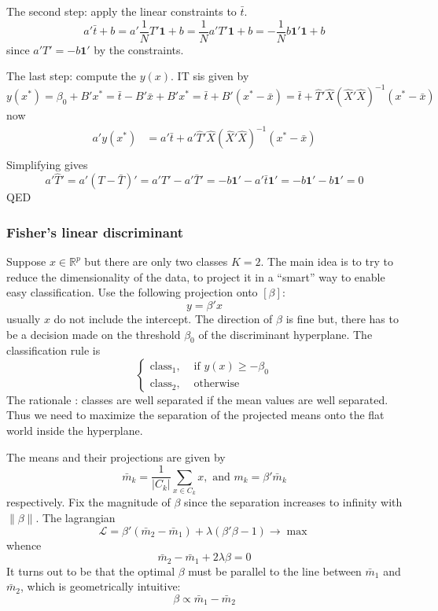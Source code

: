 \documentclass[a4paper]{article}
\newcommand{\Real}{\mathbb{R}}
\newcommand{\Lcal}{\mathcal{L}}
\newcommand{\one}{\mathbf{1}}
\begin{document}
The second step: apply the linear constraints to $\bar{t}$.
\[
a'\bar{t} + b
= a'\frac{1}{N}T'\one + b
= \frac{1}{N} a'T'\one + b
= -\frac{1}{N} b\one' \one + b
\]
since $a'T' = -b\one'$ by the constraints.

The last step: compute the $y(x)$.
IT sis given by
\[
y(x^*)
= \beta_0 + B'x^*
= \bar{t} - B'\bar{x} + B'x^*
= \bar{t} + B'(x^*-\bar{x})
= \bar{t} + \hat{T}'\hat{X}(\hat{X}'\hat{X})^{-1}(x^*-\bar{x})
\]
now \begin{align*}
a'y(x^*)
	&= a'\bar{t} + a'\hat{T}'\hat{X}(\hat{X}'\hat{X})^{-1}(x^*-\bar{x})\\
\end{align*}
Simplifying gives
\[
a'\hat{T}'
= a'(T-\bar{T})'
= a'T'-a'\bar{T}'
= - b\one' - a'\bar{t}\one'
= - b\one' - b\one'
=0
\]
QED


\subsubsection{Fisher's linear discriminant} %
\label{ssub:fisher_s_linear_discriminant}

Suppose $x\in \Real^{p}$ but there are only two classes $K=2$. The main idea is
to try to reduce the dimensionality of the data, to project it in a ``smart'' way
to enable easy classification. Use the following projection onto $[\beta]$:
\[y = \beta'x\]
usually $x$ do not include the intercept.
The direction of $\beta$ is fine but, there has to be a decision made on the
threshold $\beta_0$ of the discriminant hyperplane.
The classification rule is 
\[\begin{cases}
	\text{class}_1, &\text{ if } y(x)\geq -\beta_0\\
	\text{class}_2, &\text{ otherwise}
\end{cases}\]
The rationale : classes are well separated if the mean values are well separated.
Thus we need to maximize the separation of the projected means onto the flat world
inside the hyperplane.

The means and their projections are given by
\[
\bar{m}_k = \frac{1}{|C_k|}\sum_{x\in C_k} x,
\text{ and }
m_k = \beta'\bar{m}_k
\]
respectively. Fix the magnitude of $\beta$ since the separation increases to infinity
with $\|\beta\|$. The lagrangian
\[\Lcal = \beta'(\bar{m}_2-\bar{m}_1) + \lambda (\beta'\beta - 1)\to\max\]
whence
\[\bar{m}_2-\bar{m}_1 + 2\lambda\beta = 0\]
It turns out to be that the optimal $\beta$ must be parallel to the line between
$\bar{m}_1$ and $\bar{m}_2$, which is geometrically intuitive:
\[\beta \propto \bar{m}_1-\bar{m}_2\]
\end{document}
